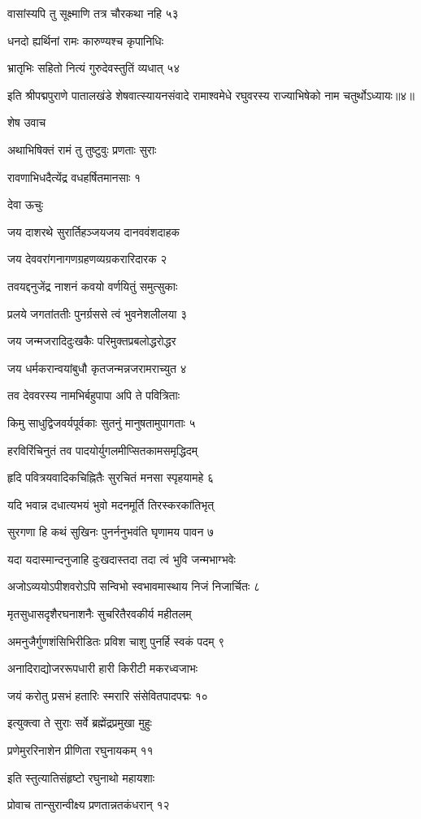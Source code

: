 वासांस्यपि तु सूक्ष्माणि तत्र चौरकथा नहि ५३

धनदो ह्यर्थिनां रामः कारुण्यश्च कृपानिधिः

भ्रातृभिः सहितो नित्यं गुरुदेवस्तुतिं व्यधात् ५४

इति श्रीपद्मपुराणे पातालखंडे शेषवात्स्यायनसंवादे रामाश्वमेधे रघुवरस्य राज्याभिषेको नाम चतुर्थोऽध्यायः॥४॥


शेष उवाच

अथाभिषिक्तं रामं तु तुष्टुवुः प्रणताः सुराः

रावणाभिधदैत्येंद्र वधहर्षितमानसाः १

देवा ऊचुः

जय दाशरथे सुरार्तिहञ्जयजय दानववंशदाहक

जय देववरांगनागणग्रहणव्यग्रकरारिदारक २

तवयद्दनुजेंद्र नाशनं कवयो वर्णयितुं समुत्सुकाः

प्रलये जगतांततीः पुनर्ग्रससे त्वं भुवनेशलीलया ३

जय जन्मजरादिदुःखकैः परिमुक्तप्रबलोद्धरोद्धर

जय धर्मकरान्वयांबुधौ कृतजन्मन्नजरामराच्युत ४

तव देववरस्य नामभिर्बहुपापा अपि ते पवित्रिताः

किमु साधुद्विजवर्यपूर्वकाः सुतनुं मानुषतामुपागताः ५

हरविरिंचिनुतं तव पादयोर्युगलमीप्सितकामसमृद्धिदम्

हृदि पवित्रयवादिकचिह्नितैः सुरचितं मनसा स्पृहयामहे ६

यदि भवान्न दधात्यभयं भुवो मदनमूर्ति तिरस्करकांतिभृत्

सुरगणा हि कथं सुखिनः पुनर्ननुभवंति घृणामय पावन ७

यदा यदास्मान्दनुजाहि दुःखदास्तदा तदा त्वं भुवि जन्मभाग्भवेः

अजोऽव्ययोऽपीशवरोऽपि सन्विभो स्वभावमास्थाय निजं निजार्चितः ८

मृतसुधासदृशैरघनाशनैः सुचरितैरवकीर्य महीतलम्

अमनुजैर्गुणशंसिभिरीडितः प्रविश चाशु पुनर्हि स्वकं पदम् ९

अनादिराद्योजररूपधारी हारी किरीटी मकरध्वजाभः

जयं करोतु प्रसभं हतारिः स्मरारि संसेवितपादपद्मः १०

इत्युक्त्वा ते सुराः सर्वे ब्रह्मेंद्रप्रमुखा मुहुः

प्रणेमुररिनाशेन प्रीणिता रघुनायकम् ११

इति स्तुत्यातिसंहृष्टो रघुनाथो महायशाः

प्रोवाच तान्सुरान्वीक्ष्य प्रणतान्नतकंधरान् १२

